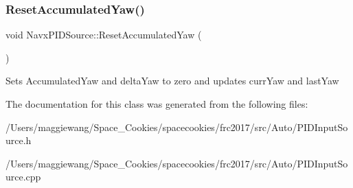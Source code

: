 \subsubsection{\texorpdfstring{Reset\+Accumulated\+Yaw()}{ResetAccumulatedYaw()}}
{\footnotesize\ttfamily void Navx\+P\+I\+D\+Source\+::\+Reset\+Accumulated\+Yaw (\begin{DoxyParamCaption}{ }\end{DoxyParamCaption})}

Sets Accumulated\+Yaw and delta\+Yaw to zero and updates curr\+Yaw and last\+Yaw 

The documentation for this class was generated from the following files\+:\begin{DoxyCompactItemize}
\item 
/\+Users/maggiewang/\+Space\+\_\+\+Cookies/spacecookies/frc2017/src/\+Auto/P\+I\+D\+Input\+Source.\+h\item 
/\+Users/maggiewang/\+Space\+\_\+\+Cookies/spacecookies/frc2017/src/\+Auto/P\+I\+D\+Input\+Source.\+cpp\end{DoxyCompactItemize}
